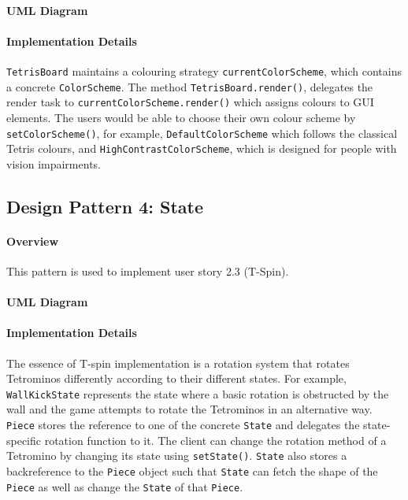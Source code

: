 \documentclass{article}
\begin{document}
\paragraph{UML Diagram}\hfill

\begin{figure}[H]
    
\end{figure}

\paragraph{Implementation Details}

\verb`TetrisBoard` maintains a colouring strategy \verb`currentColorScheme`, which contains a concrete
\verb`ColorScheme`. The method \verb`TetrisBoard.render()`, delegates the render task to \verb`currentColorScheme.render()` which assigns colours to GUI elements. The users would be able to choose their own colour scheme by \verb`setColorScheme()`, for example, \verb`DefaultColorScheme` which follows the classical Tetris colours, and \verb`HighContrastColorScheme`, which is designed for people with vision impairments.

\clearpage

\subsection{Design Pattern 4: State}

\paragraph{Overview}
This pattern is used to implement user story 2.3 (T-Spin).

\paragraph{UML Diagram}\hfill

\begin{figure}[H]
    
\end{figure}

\paragraph{Implementation Details}

The essence of T-spin implementation is a rotation system that rotates Tetrominos differently according to their different states. For example, \verb`WallKickState` represents the state where a basic rotation is obstructed by the wall and the game attempts to rotate the Tetrominos in an alternative way. \verb`Piece` stores the reference to one of the concrete \verb`State` and delegates the state-specific rotation function to it. The client can change the rotation method of a Tetromino by changing its state using \verb`setState()`. \verb`State` also stores a backreference to the \verb`Piece` object such that \verb`State` can fetch the shape of the \verb`Piece` as well as change the \verb`State` of that \verb`Piece`.
\end{document}
